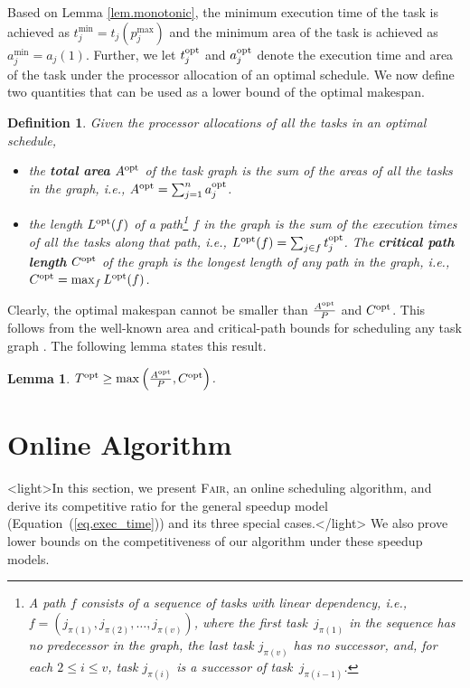 \documentclass{article}
\newtheorem{lemma}{Lemma}
\newtheorem{definition}{Definition}
\newcommand\fair{\textsc{Fair}\xspace}
\newcommand\opt{\textnormal{opt}\xspace}
\newcommand{\LP}[2][inline]{\todo[color=green!50,#1]{\sf \textbf{Lucas:} #2}
\xspace}
\begin{document}
Based on Lemma \ref{lem.monotonic}, the minimum execution time of the task is achieved as $t_j^{\min} = t_j(p_j^{\max})$ and the minimum area of the task is achieved as $a_j^{\min} = a_j(1)$.
Further, we let $t_j^{\opt}$ and $a_j^{\opt}$ denote the execution time and area of the task under the processor allocation of an optimal schedule.
We now define two quantities that can be used as a lower bound of the optimal makespan.

\begin{definition}
Given the processor allocations of all the tasks in an optimal schedule,
\begin{itemize}
  \item the \textbf{\emph{total area}} $A^{\opt}$ of the task graph is the sum of the areas of all the tasks in the graph, i.e., $A^{\opt} = \sum_{j=1}^{n} a_j^{\opt}$.
  \item the length $L^{\opt}(f)$ of a path\footnote{A path $f$ consists of a sequence of tasks with linear dependency, i.e., $f = (j_{\pi(1)}, j_{\pi(2)}, \dots, j_{\pi(v)})$, where the first task~$j_{\pi(1)}$ in the sequence has no predecessor in the graph, the last task $j_{\pi(v)}$ has no successor, and, for each $2\le i\le v$, task $j_{\pi(i)}$ is a successor of task~$j_{\pi(i-1)}$.} $f$ in the graph is the sum of the execution times of all the tasks along that path, i.e., $L^{\opt}(f) = \sum_{j\in f}t_j^{\opt}$. The \textbf{\emph{critical path length}} $C^{\opt}$ of the graph is the longest length of any path in the graph, i.e., $C^{\opt} = \max_{f} L^{\opt}(f)$.
\end{itemize}
\end{definition}

Clearly, the optimal makespan cannot be smaller than $\frac{A^{\opt}}{P}$ and $C^{\opt}$. This follows from the well-known area and critical-path bounds for scheduling any task graph \cite{Graham69}.
The following lemma states this result.
\begin{lemma}\label{lem.lower}
$T^{\opt} \ge \max \left(\frac{A^{\opt}}{P}, C^{\opt} \right)$.
\end{lemma}


\section{Online Algorithm}
\label{sec.alg}
\LP{Updated from TOPC Paper}
<light>In this section, we present \fair, an online scheduling algorithm, and derive its competitive ratio for the general speedup model (Equation~(\ref{eq.exec_time})) and its three special cases.</light> We also prove lower bounds on the competitiveness of our algorithm under these speedup models.
\end{document}
